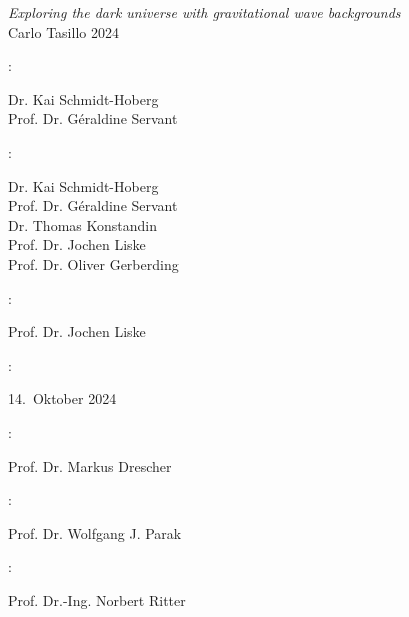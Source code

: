 \thispagestyle{empty}

\hfill

\vfill

\textit{Exploring the dark universe with gravitational wave backgrounds}\\
\textcopyright \quad Carlo Tasillo 2024


\bigskip

\noindent {}: \vspace{-0.5cm}
\begin{flushright}
	Dr. Kai Schmidt-Hoberg\\
	Prof. Dr. Géraldine Servant
\end{flushright}


: \vspace{-0.5cm}
\begin{flushright}
	Dr. Kai Schmidt-Hoberg\\
	Prof. Dr. Géraldine Servant\\
	Dr. Thomas Konstandin\\
	Prof. Dr. Jochen Liske\\
	Prof. Dr. Oliver Gerberding
\end{flushright}


: \vspace{-0.5cm}
\begin{flushright}
	Prof. Dr. Jochen Liske
\end{flushright}

: \vspace{-0.5cm}
\begin{flushright}
	14.~Oktober 2024
\end{flushright}

:\vspace{-0.5cm}
\begin{flushright}
	Prof. Dr. Markus Drescher
\end{flushright}

:\vspace{-0.5cm}
\begin{flushright}
	Prof. Dr. Wolfgang J. Parak
\end{flushright}

:\vspace{-0.5cm}
\begin{flushright}
	Prof. Dr.-Ing. Norbert Ritter
\end{flushright}



